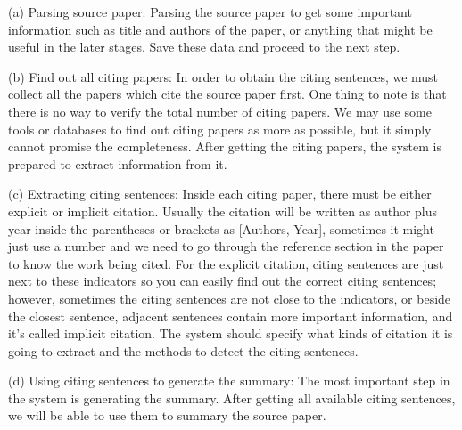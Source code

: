 \documentclass[hyp]{socreport}
\begin{document}


(a) Parsing source paper: Parsing the source paper to get some important information such as title and authors of the paper,
or anything that might be useful in the later stages. Save these data and proceed to the next step.

(b) Find out all citing papers: In order to obtain the citing sentences, we must collect all the papers which cite the source 
paper first. 
One thing to note is that there is no way to verify the total number of citing papers. We may use some tools or 
databases to find out citing papers as more as possible, but it simply cannot promise the completeness. After getting the 
citing papers, the system is prepared to extract information from it.

(c) Extracting citing sentences: Inside each citing paper, there must be either explicit or implicit citation. Usually the 
citation will be written as author plus year inside the parentheses or brackets as [Authors, Year], sometimes it might just 
use a number and we need to go through the reference section in the paper to know the work being cited. For the explicit citation, 
citing sentences are just next to these indicators so you can easily find out the correct citing sentences; however, sometimes the 
citing sentences are not close to the indicators, or beside the closest sentence, adjacent sentences contain more important information, 
and it’s called implicit citation. The system should specify what kinds of citation it is going to extract and the methods to detect 
the citing sentences.

(d) Using citing sentences to generate the summary: The most important step in the system is generating the summary. After getting 
all available citing sentences, we will be able to use them to summary the source paper.  
\end{document}
